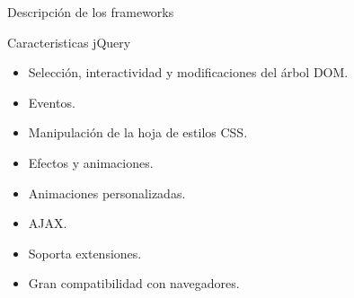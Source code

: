 \documentclass[spanish,xcolor=table,svgnames]{beamer}
\begin{document}
\begin{frame}{Descripción de los frameworks}
 \begin{block}{Caracteristicas jQuery}
  \begin{itemize}
\item Selección, interactividad y modificaciones del árbol DOM.
\item Eventos.
\item Manipulación de la hoja de estilos CSS.
\item Efectos y animaciones.
\item Animaciones personalizadas.
\item AJAX.
\item Soporta extensiones.
\item Gran compatibilidad con navegadores.
\end{itemize}
  \end{block}
\end{frame}
\end{document}
